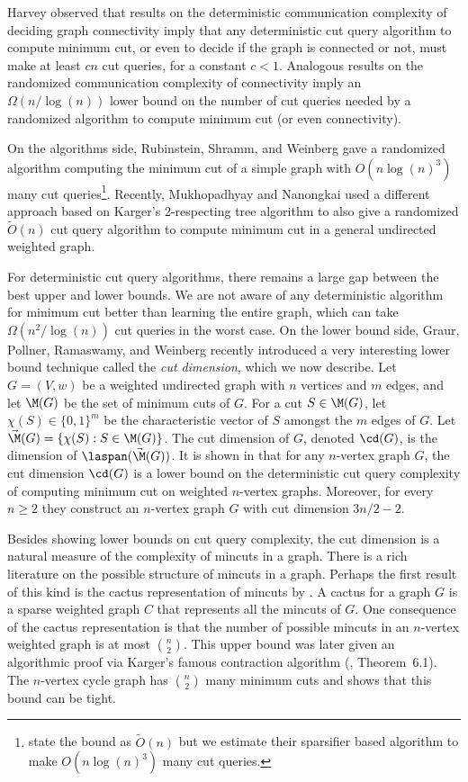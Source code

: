 Harvey \cite{Harvey08} observed that results on the deterministic communication complexity of deciding graph connectivity \cite{HMT88} imply that any deterministic cut query algorithm to compute minimum cut,
or even to decide if the graph is connected or not, must make at least $c n$ cut queries, for a constant $c < 1$.  Analogous results on the randomized communication complexity of connectivity \cite{BFS86}
imply an $\Omega(n/\log(n))$ lower bound on the number of cut queries needed by a randomized algorithm to compute minimum cut (or even connectivity).

On the algorithms side, Rubinstein, Shramm, and Weinberg \cite{RSW18} gave a randomized algorithm computing the minimum cut of a simple graph with $O(n \log(n)^3)$ many
cut queries\footnote{\cite{RSW18} state the bound as $\tilde O(n)$ but we estimate their sparsifier based algorithm to make $O(n \log(n)^3)$ many cut queries.}.
Recently, Mukhopadhyay and Nanongkai \cite{MN20} used a different approach based on Karger's 2-respecting tree algorithm
\cite{Karger00} to also give a randomized $\tilde O(n)$ cut query algorithm to compute minimum cut in a general undirected weighted graph.

For deterministic cut query algorithms, there remains a large gap between the best upper and lower bounds.  We are not aware of any deterministic algorithm for minimum cut
better than learning the entire graph, which can take $\Omega(n^2/\log(n))$ cut queries in the worst case.  On the lower bound side, Graur, Pollner, Ramaswamy, and Weinberg \cite{GPRW20} recently introduced
a very interesting lower bound technique called the \emph{cut dimension}, which we now describe.  Let $G = (V,w)$ be a weighted undirected graph with $n$ vertices and $m$ edges, and let $\M(G)$ be
the set of minimum cuts of $G$.  For a cut $S \in \M(G)$,
let $\chi(S) \in \{0,1\}^{m}$ be the characteristic vector of $S$
amongst the $m$ edges of $G$.  Let $\vec{\M}(G) = \{\chi(S): S \in \M(G) \}$.  The cut dimension of $G$, denoted
$\cd(G)$, is the dimension of $\laspan(\vec{\M}(G))$.
It is shown in \cite{GPRW20} that for any $n$-vertex graph $G$, the cut dimension $\cd(G)$ is a lower bound on the deterministic cut query complexity of computing
minimum cut on weighted $n$-vertex graphs.  Moreover, for every $n \ge 2$ they construct an $n$-vertex graph $G$ with cut dimension $3n/2-2$.

Besides showing lower bounds on cut query complexity, the cut dimension is a natural measure of the complexity of mincuts in a graph.  There is a rich
literature on the possible structure of mincuts in a graph.  Perhaps the first result of this kind is the cactus representation of mincuts by \cite{DKL76}.
A cactus for a graph $G$ is a sparse weighted graph $C$ that represents all the mincuts of $G$.  One consequence of the
cactus representation is that the number of possible mincuts in an $n$-vertex weighted graph is at most $\binom{n}{2}$.  This upper bound was later given
an algorithmic proof via Karger's famous contraction algorithm (\cite{Karger93}, Theorem~6.1).  The
$n$-vertex cycle graph has $\binom{n}{2}$ many minimum cuts and shows that this bound can be tight.

